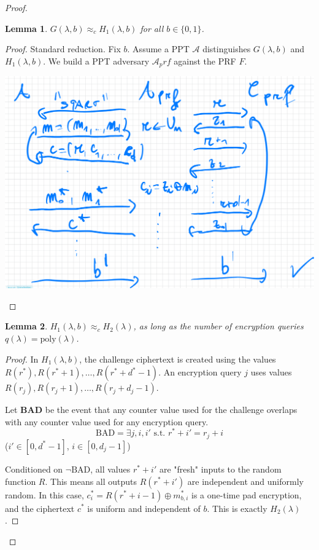 \documentclass[11pt, a4paper]{article}
\newcommand{\poly}{\text{poly}}
\newtheorem{lem}{Lemma}
\begin{document}
\begin{proof}
\begin{lem}
$G(\lambda, b) \approx_c H_1(\lambda, b)$ for all $b \in \{0,1\}$.
\end{lem}
\begin{proof}
Standard reduction. Fix $b$. Assume a PPT $\mathcal{A}$ distinguishes $G(\lambda, b)$ and $H_1(\lambda, b)$. We build a PPT adversary $\mathcal{A}_prf$ against the PRF $F$.
\begin{center}
    \includegraphics[scale=0.4]{img/Symmetric/lem1proof.png}
\end{center}
\end{proof}

\begin{lem}
$H_1(\lambda, b) \approx_c H_2(\lambda)$, as long as the number of encryption queries $q(\lambda) = \poly(\lambda)$. 
\end{lem}
\begin{proof}
In $H_1(\lambda, b)$, the challenge ciphertext is created using the values $R(r^*), R(r^*+1), \dots, R(r^*+d^*-1)$. An encryption query $j$ uses values $R(r_j), R(r_j+1), \dots, R(r_j+d_j-1)$. 

Let \textbf{BAD} be the event that any counter value used for the challenge overlaps with any counter value used for any encryption query. 
$$ \text{BAD} = \exists j, i, i' \text{ s.t. } r^*+i' = r_j+i $$ 
($i' \in [0, d^*-1]$, $i \in [0, d_j-1]$)

Conditioned on $\neg \text{BAD}$, all values $r^*+i'$ are "fresh" inputs to the random function $R$. This means all outputs $R(r^*+i')$ are independent and uniformly random. In this case, $c_i^* = R(r^*+i-1) \oplus m_{b,i}^*$ is a one-time pad encryption, and the ciphertext $c^*$ is uniform and independent of $b$. This is exactly $H_2(\lambda)$. 


\end{proof}
\end{proof}
\end{document}
